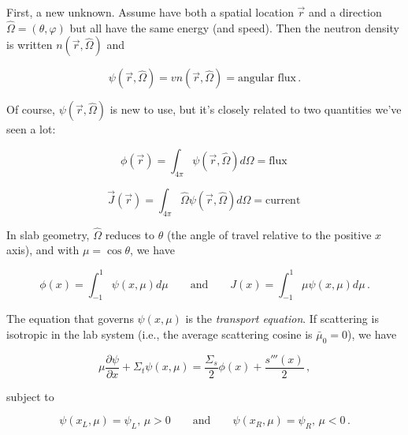 \documentclass[compact]{ne630handout}
\begin{document}
\begin{handoutflow}

First, a new unknown.  Assume have both a spatial location $\vec{r}$ and a direction $\hat{\Omega} = (\theta, \varphi)$ but all have the same energy (and speed).  Then the neutron density is written $n(\vec{r}, \hat{\Omega})$ and


\begin{equation*}
\psi(\vec{r}, \hat{\Omega}) = v n(\vec{r}, \hat{\Omega}) = \text{angular flux} \, .
\end{equation*}

Of course, $\psi(\vec{r}, \hat{\Omega})$ is new to use, but it's closely related to two quantities we've seen a lot:


\begin{equation*}
\phi(\vec{r}) = \int_{4\pi}  \psi(\vec{r}, \hat{\Omega}) d\Omega  = \text{flux}\,
\end{equation*}

\begin{equation*}
\vec{J}(\vec{r}) = \int_{4\pi} \hat{\Omega} \psi(\vec{r}, \hat{\Omega}) d\Omega = \text{current} \,
\end{equation*}

In slab geometry, $\hat{\Omega}$ reduces to $\theta$ (the angle of travel relative to the positive $x$ axis), and with $\mu = \cos{\theta}$, we have


\begin{equation*}
\phi(x) = \int^{1}_{-1} \psi(x, \mu) d\mu \qquad \text{and} \qquad J(x) = \int^{1}_{-1} \mu \psi(x, \mu) d\mu \, .
\end{equation*}

The equation that governs $\psi(x, \mu)$ is the \emph{transport equation}.  If scattering is isotropic in the lab system (i.e., the average scattering cosine is $\bar{\mu}_0 = 0$), we have


\begin{equation*}
\mu \frac{\partial \psi}{\partial x} + \Sigma_t \psi(x, \mu) = \frac{\Sigma_s}{2} \phi(x) + \frac{s'''(x)}{2} \, ,
  \tag{1}
\end{equation*}

subject to


\begin{equation*}
\psi(x_L, \mu) = \psi_L, \, \mu > 0 \qquad \text{and} \qquad \psi(x_R, \mu) = \psi_R, \, \mu < 0 \, .
\end{equation*}


\end{handoutflow}
\end{document}
